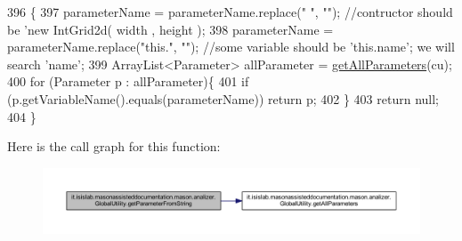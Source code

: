 \begin{DoxyCode}
396                                                                                             \{
397         parameterName = parameterName.replace(\textcolor{stringliteral}{" "}, \textcolor{stringliteral}{""}); \textcolor{comment}{//contructor should be 'new IntGrid2d( width  ,
       height  );}
398         parameterName = parameterName.replace(\textcolor{stringliteral}{"this."}, \textcolor{stringliteral}{""}); \textcolor{comment}{//some variable should be 'this.name'; we will
       search 'name';}
399         ArrayList<Parameter> allParameter = \hyperlink{classit_1_1isislab_1_1masonassisteddocumentation_1_1mason_1_1analizer_1_1_global_utility_abd9cd8d87961f84bb2b7b865e8047a1f}{getAllParameters}(cu);
400         \textcolor{keywordflow}{for} (Parameter p : allParameter)\{
401             \textcolor{keywordflow}{if} (p.getVariableName().equals(parameterName))  \textcolor{keywordflow}{return} p;
402         \}       
403         \textcolor{keywordflow}{return} null;
404     \}
\end{DoxyCode}


Here is the call graph for this function\-:
\nopagebreak
\begin{figure}[H]
\begin{center}
\leavevmode
\includegraphics[width=350pt]{classit_1_1isislab_1_1masonassisteddocumentation_1_1mason_1_1analizer_1_1_global_utility_aed7713e549a92beeb05b273f3ad80ff7_cgraph}
\end{center}
\end{figure}


